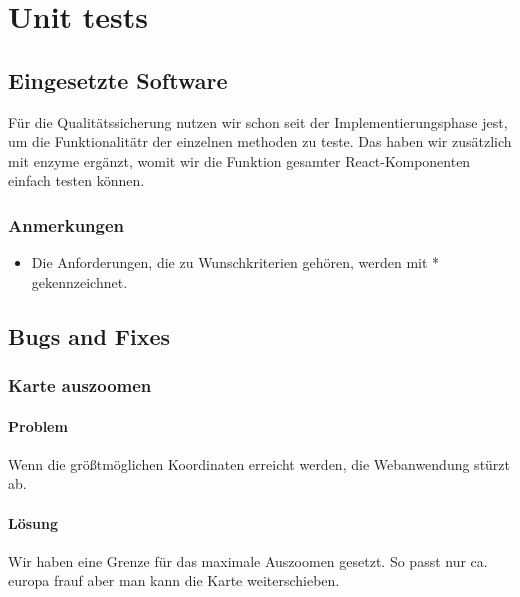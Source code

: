 \section{Unit tests}

\subsection{Eingesetzte Software}

Für die Qualitätssicherung nutzen wir schon seit der Implementierungsphase jest, um die Funktionalitätr der einzelnen methoden zu teste. Das haben wir zusätzlich mit enzyme ergänzt, womit wir die Funktion gesamter React-Komponenten einfach testen können.

\subsubsection{Anmerkungen}
\begin{itemize}
  \item Die Anforderungen, die zu Wunschkriterien gehören, werden mit * gekennzeichnet.
\end{itemize}

\subsection{Bugs and Fixes}

\subsubsection{Karte auszoomen}
\paragraph{Problem}
Wenn die größtmöglichen Koordinaten erreicht werden, die Webanwendung stürzt ab.

\paragraph{Lösung}
Wir haben eine Grenze für das maximale Auszoomen gesetzt. So passt nur ca. europa frauf aber man kann die Karte weiterschieben.



